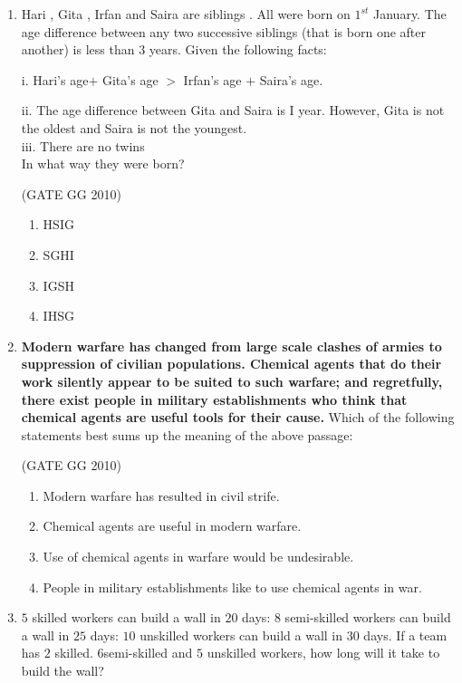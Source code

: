 \documentclass[journal]{IEEEtran}
\begin{document}
\begin{enumerate}[start=26]
\item  Hari , Gita , Irfan  and Saira  are siblings . All were born on $1^{st}$ January. The age difference between any two successive siblings (that is born one after another) is less than $3$ years. Given the following facts:

i. Hari's age$+$ Gita's age $>$ Irfan's age $+$ Saira's age.

ii. The age difference between Gita and Saira is I year. However, Gita is not the oldest and Saira is not the youngest.\\
iii. There are no twins\\
In what way they were born?

\hfill{(GATE GG 2010)}

\begin{enumerate}
    \item  HSIG
\item  SGHI
\item  IGSH
\item  IHSG

\end{enumerate}

\item \textbf{Modern warfare has changed from large scale clashes of armies to suppression of civilian populations. Chemical agents that do their work silently appear to be suited to such warfare; and regretfully, there exist people in military establishments who think that chemical agents are useful tools for their cause.}
Which of the following statements best sums up the meaning of the above passage:

\hfill{(GATE GG 2010)}

\begin{enumerate}
    \item  Modern warfare has resulted in civil strife.

\item  Chemical agents are useful in modern warfare.
\item  Use of chemical agents in warfare would be undesirable.
\item  People in military establishments like to use chemical agents in war.
\end{enumerate}

\item  $5$ skilled workers can build a wall in $20$ days: $8$ semi-skilled workers can build a wall in $25$ days: $10$ unskilled workers can build a wall in $30$ days. If a team has $2$ skilled. $6$semi-skilled and $5$ unskilled workers, how long will it take to build the wall? 


\end{enumerate}
\end{document}
